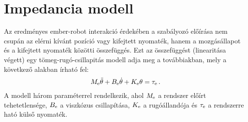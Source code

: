 \chapter{Impedancia modell}\label{impedance_model}
Az eredményes ember-robot interakció érdekében a szabályozó előírása nem csupán 
az elérni kívánt pozíció vagy kifejtett nyomaték, hanem a mozgásállapot és a kifejtett
nyomaték közötti összefüggés. Ezt az összefüggést (linearitása végett) egy 
tömeg-rugó-csillapitás modell adja meg a továbbiakban, mely a következő alakban
írható fel: 
\begin{align}
    M_{\mathrm{e}} \ddot \theta + B_{\mathrm{e}} \dot \theta + K_{\mathrm{e}} \theta = \tau_{\mathrm{e}}\,.
\end{align}
A modell három paraméterrel rendelkezik, ahol $M_{\mathrm{e}}$ a rendszer előírt tehetetlensége, 
$B_{\mathrm{e}}$ a viszkózus csillapítása, $K_{\mathrm{e}}$ a rugóállandója és $\tau_{\mathrm{e}}$ a rendszerre ható 
külső nyomaték. 